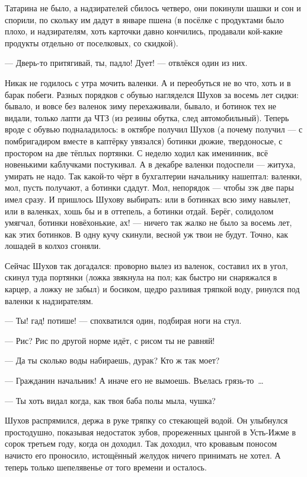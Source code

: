 Татарина не было, а надзирателей сбилось четверо, они покинули шашки и сон и спорили, по скольку им дадут в январе пшена (в посёлке с продуктами было плохо, и надзирателям, хоть карточки давно кончились, продавали кой-какие продукты отдельно от поселковых, со скидкой).

--- Дверь-то притягивай, ты, падло! Дует! --- отвлёкся один из них.

Никак не годилось с утра мочить валенки. А и переобуться не во что, хоть и в барак побеги. Разных порядков с обувью нагляделся Шухов за восемь лет сидки: бывало, и вовсе без валенок зиму перехаживали, бывало, и ботинок тех не видали, только лапти да ЧТЗ (из резины обутка, след автомобильный). Теперь вроде с обувью подналадилось: в октябре получил Шухов (а почему получил --- с помбригадиром вместе в каптёрку увязался) ботинки дюжие, твердоносые, с простором на две тёплых портянки. С неделю ходил как именинник, всё новенькими каблучками постукивал. А в декабре валенки подоспели --- житуха, умирать не надо. Так какой-то чёрт в бухгалтерии начальнику нашептал: валенки, мол, пусть получают, а ботинки сдадут. Мол, непорядок --- чтобы зэк две пары имел сразу. И пришлось Шухову выбирать: или в ботинках всю зиму навылет, или в валенках, хошь бы и в оттепель, а ботинки отдай. Берёг, солидолом умягчал, ботинки новёхонькие, ах! --- ничего так жалко не было за восемь лет, как этих ботинков. В одну кучу скинули, весной уж твои не будут. Точно, как лошадей в колхоз сгоняли.

Сейчас Шухов так догадался: проворно вылез из валенок, составил их в угол, скинул туда портянки (ложка звякнула на пол; как быстро ни снаряжался в карцер, а ложку не забыл) и босиком, щедро разливая тряпкой воду, ринулся под валенки к надзирателям.

--- Ты! гад! потише! --- спохватился один, подбирая ноги на стул.

--- Рис? Рис по другой норме идёт, с рисом ты не равняй!

--- Да ты сколько воды набираешь, дурак? Кто ж так моет?

--- Гражданин начальник! А иначе его не вымоешь. Въелась грязь-то~\dots{}

--- Ты хоть видал когда, как твоя баба полы мыла, чушка?

Шухов распрямился, держа в руке тряпку со стекающей водой. Он улыбнулся простодушно, показывая недостаток зубов, прореженных цынгой в Усть-Ижме в сорок третьем году, когда он доходил. Так доходил, что кровавым поносом начисто его проносило, истощённый желудок ничего принимать не хотел. А теперь только шепелявенье от того времени и осталось.

